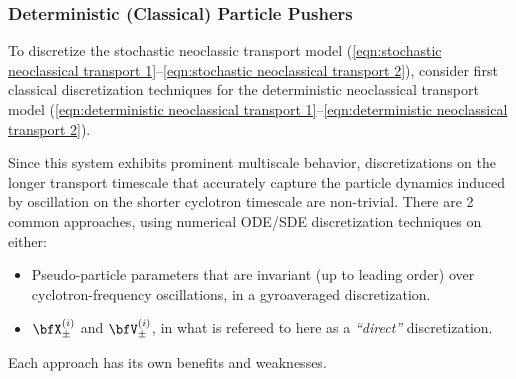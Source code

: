 \subsubsection{Deterministic (Classical) Particle Pushers}
    To discretize the stochastic neoclassic transport model (\ref{eqn:stochastic neoclassical transport 1}--\ref{eqn:stochastic neoclassical transport 2}), consider first classical discretization techniques for the deterministic neoclassical transport model (\ref{eqn:deterministic neoclassical transport 1}--\ref{eqn:deterministic neoclassical transport 2}).
    
    Since this system exhibits prominent multiscale behavior, discretizations on the longer transport timescale that accurately capture the particle dynamics induced by oscillation on the shorter cyclotron timescale are non-trivial. There are 2 common approaches, using numerical ODE/SDE discretization techniques on either:
    \begin{itemize}
        \item  Pseudo-particle parameters that are invariant (up to leading order) over cyclotron-frequency oscillations, in a gyroaveraged discretization.
        \item  $\bfX_{\pm}^{(i)}$ and $\bfV_{\pm}^{(i)}$, in what is refereed to here as a \emph{``direct''} discretization.
    \end{itemize}
    Each approach has its own benefits and weaknesses.


    
    
    